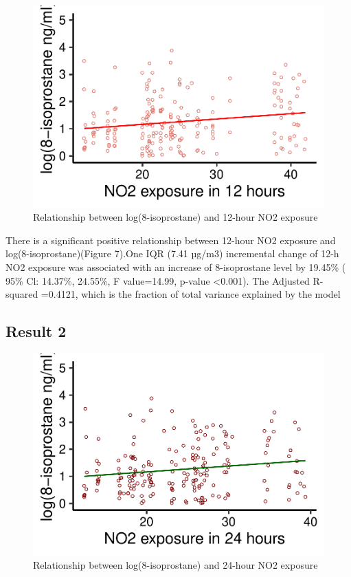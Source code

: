 \documentclass[12pt,]{article}
\begin{document}
\begin{figure}
\centering
\includegraphics{Wang_ENV872_Project_files/figure-latex/unnamed-chunk-10-1.pdf}
\caption{Relationship between log(8-isoprostane) and 12-hour NO2
exposure}
\end{figure}

There is a significant positive relationship between 12-hour NO2
exposure and log(8-isoprostane)(Figure 7).One IQR (7.41 µg/m3)
incremental change of 12-h NO2 exposure was associated with an increase
of 8-isoprostane level by 19.45\% ( 95\% Cl: 14.37\%, 24.55\%, F
value=14.99, p-value \textless0.001). The Adjusted R-squared =0.4121,
which is the fraction of total variance explained by the model

\hypertarget{result-2}{%
\subsection{Result 2}\label{result-2}}

\begin{figure}
\centering
\includegraphics{Wang_ENV872_Project_files/figure-latex/unnamed-chunk-11-1.pdf}
\caption{Relationship between log(8-isoprostane) and 24-hour NO2
exposure}
\end{figure}
\end{document}
